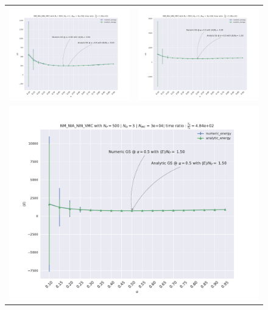 \begin{figure}
\hspace{-2.8cm}
\begin{tabular}{cc}
\includegraphics[width = 0.5\paperwidth]{figures/NM_NIA_NIN_np_500_nd_1.pdf} & \includegraphics[width = 0.5\paperwidth]{figures/NM_NIA_NIN_np_500_nd_2.pdf} \\
\multicolumn{2}{c}{\includegraphics[width=0.5\paperwidth]{figures/NM_NIA_NIN_np_500_nd_3.pdf} }

\end{tabular}
\end{figure}
